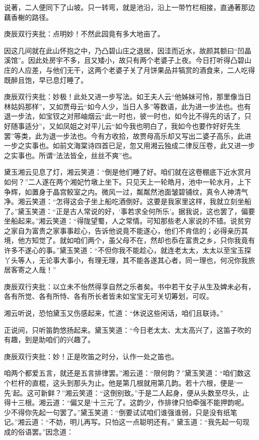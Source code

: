\begin{parag}
    说著，二人便同下了山坡。只一转弯，就是池沿，沿上一带竹栏相接，直通著那边藕香榭的路径。\begin{note}庚辰双行夹批：点明妙！不然此园竟有多大地亩了。\end{note}因这几间就在此山怀抱之中，乃凸碧山庄之退居，因洼而近水，故颜其额曰“凹晶溪馆”。因此处房宇不多，且又矮小，故只有两个老婆子上夜。今日打听得凸碧山庄的人应差，与他们无干，这两个老婆子关了月饼果品并犒赏的酒食来，二人吃得既醉且饱，早已息灯睡了。\begin{note}庚辰双行夹批：妙极！此处又进一步写法。如王夫人云“他姊妹可怜，那里像当日林姑妈那样”，又如贾母云“如今人少，当日人多”等数语，此为进一步法也。也有退一步法，如宝钗之对邢岫烟云“此一时也，彼一时也，如今比不得先的话了，只好随事适分”，又如凤姐之对平儿云“如今我也明白了，我如今也要作好好先生罢”等类，此为退一步法也。今有方收拾，故贾母高乐却又写出二婆子高乐，此进一步之实事也。如前文海棠诗四首已足，忽又用湘云独成二律反压卷，此又进一步之实事也。所谓“法法皆全，丝丝不爽”也。\end{note}
\end{parag}


\begin{parag}
    黛玉湘云见息了灯，湘云笑道：“倒是他们睡了好。咱们就在这卷棚底下近水赏月如何？”二人遂在两个湘妃竹墩上坐下。只见天上一轮皓月，池中一轮水月，上下争辉，如置身于晶宫鲛室之内。微风一过，粼粼然池面皱碧铺纹，真令人神清气净。湘云笑道：“怎得这会子坐上船吃酒倒好。这要是我家里这样，我就立刻坐船了。”黛玉笑道：“正是古人常说的好，‘事若求全何所乐’。据我说，这也罢了，偏要坐船起来。”湘云笑道：“得陇望蜀，人之常情。可知那些老人家说的不错。说贫穷之家自为富贵之家事事趁心，告诉他说竟不能遂心，他们不肯信的；必得亲历其境，他方知觉了。就如咱们两个，虽父母不在，然却也忝在富贵之乡，只你我竟有许多不遂心的事。”黛玉笑道：“不但你我不能趁心，就连老太太，太太以至宝玉探丫头等人，无论事大事小，有理无理，其不能各遂其心者，同一理也，何况你我旅居客寄之人哉！”\begin{note}庚辰双行夹批：以立未不怡然得享自然之乐者矣。书中若干女子从生及婢未必有，各有所觉、各有所恃、各有所长者皆未如宝宝无可关切筹划，可叹。\end{note}湘云听说，恐怕黛玉又伤感起来，忙道：“休说这些闲话，咱们且联诗。”
\end{parag}


\begin{parag}
    正说间，只听笛韵悠扬起来。黛玉笑道：“今日老太太、太太高兴了，这笛子吹的有趣，到是助咱们的兴趣了。\begin{note}庚辰双行夹批：妙！正是吹笛之时分，认作一处之笛也。\end{note}咱两个都爱五言，就还是五言排律罢。”湘云道：“限何韵？”黛玉笑道：“咱们数这个栏杆的直棍，这头到那头为止。他是第几根就用第几韵。若十六根，便是‘一先’起。这可新鲜？”湘云笑道：“这倒别致。”于是二人起身，便从头数至尽头，止得十三根。湘云道：“偏又是‘十三元’了。这韵少，作排律只怕牵强不能押韵呢。少不得你先起一句罢了。”黛玉笑道：“倒要试试咱们谁强谁弱，只是没有纸笔记。”湘云道：“不妨，明儿再写。只怕这一点聪明还有。” 黛玉道：“我先起一句现成的俗语罢。”因念道：
\end{parag}


